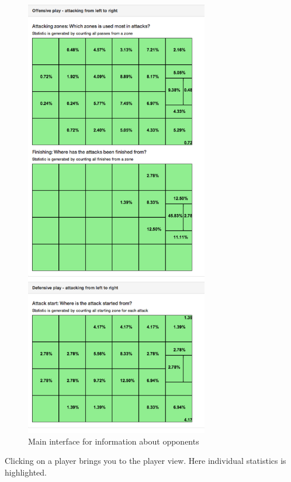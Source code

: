\begin{figure}[ht!]
\includegraphics[width=80mm]{images/general/team_analysis2.png}
\caption{Main interface for information about opponents}
\label{overflow}
\end{figure}

Clicking on a player brings you to the player view. Here individual statistics is highlighted. 

